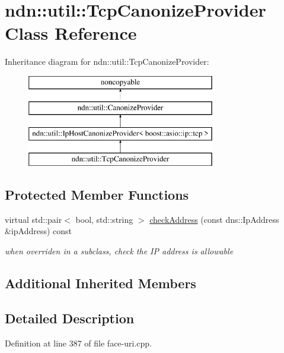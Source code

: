 \hypertarget{classndn_1_1util_1_1TcpCanonizeProvider}{}\section{ndn\+:\+:util\+:\+:Tcp\+Canonize\+Provider Class Reference}
\label{classndn_1_1util_1_1TcpCanonizeProvider}
Inheritance diagram for ndn\+:\+:util\+:\+:Tcp\+Canonize\+Provider\+:\begin{figure}[H]
\begin{center}
\leavevmode
\includegraphics[height=4.000000cm]{classndn_1_1util_1_1TcpCanonizeProvider}
\end{center}
\end{figure}
\subsection*{Protected Member Functions}
\begin{DoxyCompactItemize}
\item 
virtual std\+::pair$<$ bool, std\+::string $>$ \hyperlink{classndn_1_1util_1_1TcpCanonizeProvider_a3f99d555d6b0ef28ab03b0918173742c}{check\+Address} (const dns\+::\+Ip\+Address \&ip\+Address) const
\begin{DoxyCompactList}\small\item\em when overriden in a subclass, check the IP address is allowable \end{DoxyCompactList}\end{DoxyCompactItemize}
\subsection*{Additional Inherited Members}


\subsection{Detailed Description}


Definition at line 387 of file face-\/uri.\+cpp.



